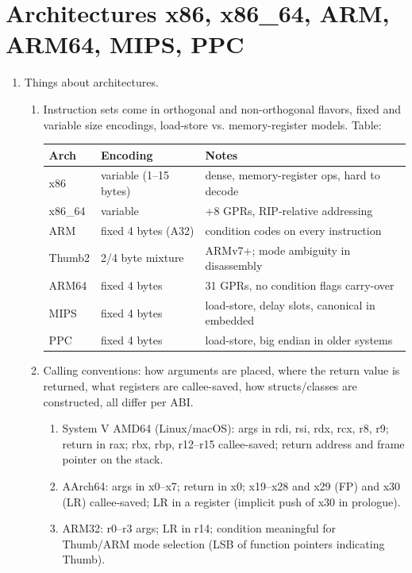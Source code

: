 \documentclass[12pt]{Training}
\begin{document}
\section*{Architectures x86, x86\_64, ARM, ARM64, MIPS, PPC}
\begin{enumerate}
    \item Things about architectures.
    \begin{enumerate}
        \item Instruction sets come in orthogonal and non-orthogonal flavors, fixed and variable size encodings, load-store vs. memory-register models. Table:
        \begin{center}
        \footnotesize
        \begin{tabular}{@{}lll@{}}
        \toprule
        Arch & Encoding & Notes \\
        \midrule
        x86 & variable (1--15 bytes) & dense, memory-register ops, hard to decode \\
        x86\_64 & variable & +8 GPRs, RIP-relative addressing \\
        ARM & fixed 4 bytes (A32) & condition codes on every instruction \\
        Thumb2 & 2/4 byte mixture & ARMv7+; mode ambiguity in disassembly \\
        ARM64 & fixed 4 bytes & 31 GPRs, no condition flags carry-over \\
        MIPS & fixed 4 bytes & load-store, delay slots, canonical in embedded \\
        PPC & fixed 4 bytes & load-store, big endian in older systems \\
        \bottomrule
        \end{tabular}
        \end{center}
        \item Calling conventions: how arguments are placed, where the return value is returned, what registers are callee-saved, how structs/classes are constructed, all differ per ABI.
        \begin{enumerate}
            \item System V AMD64 (Linux/macOS): args in rdi, rsi, rdx, rcx, r8, r9; return in rax; rbx, rbp, r12--r15 callee-saved; return address and frame pointer on the stack.
            \item AArch64: args in x0--x7; return in x0; x19--x28 and x29 (FP) and x30 (LR) callee-saved; LR in a register (implicit push of x30 in prologue).
            \item ARM32: r0--r3 args; LR in r14; condition meaningful for Thumb/ARM mode selection (LSB of function pointers indicating Thumb).

\end{enumerate}
\end{enumerate}
\end{enumerate}
\end{document}
